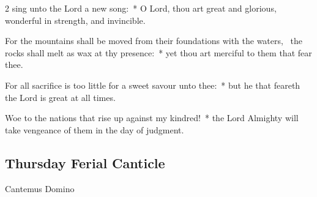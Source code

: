 \begin{multicols}{2}
 sing unto the Lord a new song:~* O Lord, thou art great and glorious, wonderful in strength, and invincible.\par
{}
For the mountains shall be moved from their foundations with the waters,~{\dag} the rocks shall melt as wax at thy presence:~* yet thou art merciful to them that fear thee.\par
For all sacrifice is too little for a sweet savour unto thee:~* but he that feareth the Lord is great at all times.\par
Woe to the nations that rise up against my kindred!~* the Lord Almighty will take vengeance of them in the day of judgment.

\subsection{Thursday Ferial Canticle}

\begin{inhead}
Cantemus Domino
\end{inhead}


\end{multicols}

